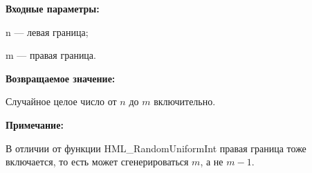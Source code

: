 \textbf{Входные параметры:}

n --- левая граница;

 m --- правая граница.

\textbf{Возвращаемое значение:}

Случайное целое число от $n$ до $m$ включительно.

\textbf{Примечание:}

 В отличии от функции HML\_RandomUniformInt правая граница тоже включается, то есть может сгенерироваться $m$, а не $m-1$.